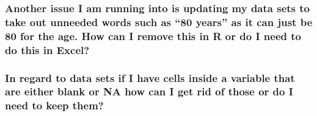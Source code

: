 \documentclass[
]{article}
\begin{document}
\hypertarget{another-issue-i-am-running-into-is-updating-my-data-sets-to-take-out-unneeded-words-such-as-80-years-as-it-can-just-be-80-for-the-age.-how-can-i-remove-this-in-r-or-do-i-need-to-do-this-in-excel}{%
\subsubsection{Another issue I am running into is updating my data sets
to take out unneeded words such as ``80 years'' as it can just be 80 for
the age. How can I remove this in R or do I need to do this in
Excel?}\label{another-issue-i-am-running-into-is-updating-my-data-sets-to-take-out-unneeded-words-such-as-80-years-as-it-can-just-be-80-for-the-age.-how-can-i-remove-this-in-r-or-do-i-need-to-do-this-in-excel}}

\hypertarget{in-regard-to-data-sets-if-i-have-cells-inside-a-variable-that-are-either-blank-or-na-how-can-i-get-rid-of-those-or-do-i-need-to-keep-them}{%
\subsubsection{In regard to data sets if I have cells inside a variable
that are either blank or NA how can I get rid of those or do I need to
keep
them?}\label{in-regard-to-data-sets-if-i-have-cells-inside-a-variable-that-are-either-blank-or-na-how-can-i-get-rid-of-those-or-do-i-need-to-keep-them}}
\end{document}
